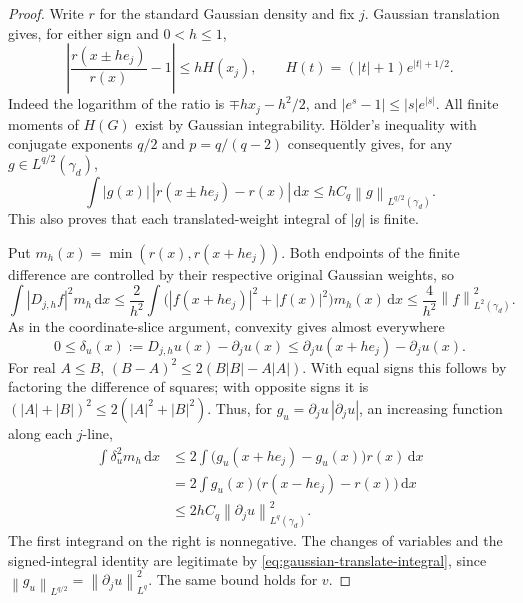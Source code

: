 \documentclass[11pt]{article}
\numberwithin{equation}{section}
\theoremstyle{remark}
\newcommand{\dd}{\,\mathrm d}
\newcommand{\norm}[1]{\left\lVert #1\right\rVert}
\begin{document}
\begin{proof}
Write $r$ for the standard Gaussian density and fix $j$. Gaussian translation gives, for either sign and $0<h\le1$,
\begin{equation}\label{eq:gaussian-ratio}
 \left|\frac{r(x\pm he_j)}{r(x)}-1\right|
 \le hH(x_j),\qquad H(t)=(|t|+1)e^{|t|+1/2}.
\end{equation}
Indeed the logarithm of the ratio is $\mp hx_j-h^2/2$, and
$|e^s-1|\le|s|e^{|s|}$. All finite moments of $H(G)$ exist by Gaussian integrability. H\"older's inequality with conjugate exponents $q/2$ and $p=q/(q-2)$ consequently gives, for any $g\in L^{q/2}(\gamma_d)$,
\begin{equation}\label{eq:gaussian-translate-integral}
 \int |g(x)|\,|r(x\pm he_j)-r(x)|\dd x
 \le hC_q\norm g_{L^{q/2}(\gamma_d)}.
\end{equation}
This also proves that each translated-weight integral of $|g|$ is finite.

Put $m_h(x)=\min(r(x),r(x+he_j))$. Both endpoints of the finite difference are controlled by their respective original Gaussian weights, so
\begin{equation}\label{eq:gaussian-difference}
 \int|D_{j,h}f|^2m_h\dd x
 \le\frac2{h^2}\int\bigl(|f(x+h e_j)|^2+|f(x)|^2\bigr)m_h(x)\dd x
 \le\frac4{h^2}\norm f_{L^2(\gamma_d)}^2.
\end{equation}
As in the coordinate-slice argument, convexity gives almost everywhere
\[
 0\le\delta_u(x):=D_{j,h}u(x)-\partial_j u(x)
 \le\partial_j u(x+he_j)-\partial_j u(x).
\]
For real $A\le B$,
$(B-A)^2\le2(B|B|-A|A|)$. With equal signs this follows by factoring the difference of squares; with opposite signs it is $(|A|+|B|)^2\le2(|A|^2+|B|^2)$. Thus, for
$g_u=\partial_j u\,|\partial_j u|$, an increasing function along each $j$-line,
\begin{align*}
 \int\delta_u^2m_h\dd x
 &\le2\int\bigl(g_u(x+he_j)-g_u(x)\bigr)r(x)\dd x\\
 &=2\int g_u(x)\bigl(r(x-he_j)-r(x)\bigr)\dd x\\
 &\le2hC_q\norm{\partial_j u}_{L^q(\gamma_d)}^2.
\end{align*}
The first integrand on the right is nonnegative. The changes of variables and the signed-integral identity are legitimate by \eqref{eq:gaussian-translate-integral}, since
$\norm{g_u}_{L^{q/2}}=\norm{\partial_j u}_{L^q}^2$. The same bound holds for $v$.


\end{proof}
\end{document}
